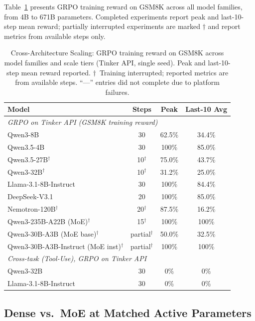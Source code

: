 \documentclass{article}
\begin{document}
Table~\ref{tab:cross_arch_scaling} presents GRPO training reward on GSM8K across
all model families, from 4B to 671B parameters. Completed experiments report
peak and last-10-step mean reward; partially interrupted experiments are
marked $\dagger$ and report metrics from available steps only.

\begin{table}[htbp]
\centering
\caption{Cross-Architecture Scaling: GRPO training reward on GSM8K across model families
and scale tiers (Tinker API, single seed). Peak and last-10-step mean reward reported.
$\dagger$~Training interrupted; reported metrics are from available steps.
``---'' entries did not complete due to platform failures.}
\label{tab:cross_arch_scaling}
\begin{tabular}{lccc}
\toprule
\textbf{Model} & \textbf{Steps} & \textbf{Peak} & \textbf{Last-10 Avg} \\
\midrule
\multicolumn{4}{l}{\textit{GRPO on Tinker API (GSM8K training reward)}} \\
\midrule
Qwen3-8B & 30 & 62.5\% & 34.4\% \\
Qwen3.5-4B & 30 & 100\% & 85.0\% \\
Qwen3.5-27B$^\dagger$ & 10$^\dagger$ & 75.0\% & 43.7\% \\
Qwen3-32B$^\dagger$ & 10$^\dagger$ & 31.2\% & 25.0\% \\
Llama-3.1-8B-Instruct & 30 & 100\% & 84.4\% \\
DeepSeek-V3.1 & 20 & 100\% & 85.0\% \\
Nemotron-120B$^\dagger$ & 20$^\dagger$ & 87.5\% & 16.2\% \\
Qwen3-235B-A22B (MoE)$^\dagger$ & 15$^\dagger$ & 100\% & 100\% \\
Qwen3-30B-A3B (MoE base)$^\dagger$ & partial$^\dagger$ & 50.0\% & 32.5\% \\
Qwen3-30B-A3B-Instruct (MoE inst)$^\dagger$ & partial$^\dagger$ & 100\% & 100\% \\
\midrule
\multicolumn{4}{l}{\textit{Cross-task (Tool-Use), GRPO on Tinker API}} \\
\midrule
Qwen3-32B & 30 & 0\% & 0\% \\
Llama-3.1-8B-Instruct & 30 & 0\% & 0\% \\
\bottomrule
\end{tabular}
\end{table}


\subsection{Dense vs.~MoE at Matched Active Parameters}
\label{sec:dense_moe}
\end{document}

